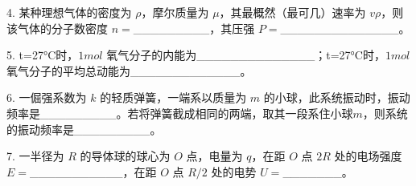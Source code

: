 4. 某种理想气体的密度为 $\rho$，摩尔质量为 $\mu$，其最概然（最可几）速率为 $v\rho$，则该气体的分子数密度 $n=$_________，其压强 $P=$______________。

5. t=27°C时，$1mol$ 氧气分子的内能为______________；t=27°C时，$1mol$ 氧气分子的平均总动能为_____________。

6. 一倔强系数为 $k$ 的轻质弹簧，一端系以质量为 $m$ 的小球，此系统振动时，振动频率是_________。若将弹簧截成相同的两端，取其一段系住小球$m$，则系统的振动频率是_________。

7. 一半径为 $R$ 的导体球的球心为 $O$ 点，电量为 $q$，在距 $O$ 点 $2R$ 处的电场强度$E=$___________，在距 $O$ 点 $R/2$ 处的电势 $U=$_______。
